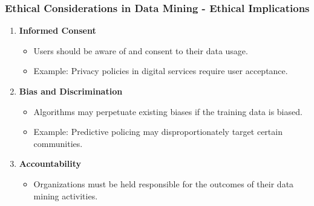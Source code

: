 \documentclass{beamer}
\begin{document}
\begin{frame}[fragile]
    \frametitle{Ethical Considerations in Data Mining - Ethical Implications}
    \begin{enumerate}
        \item \textbf{Informed Consent}
            \begin{itemize}
                \item Users should be aware of and consent to their data usage.
                \item Example: Privacy policies in digital services require user acceptance.
            \end{itemize}
        \item \textbf{Bias and Discrimination}
            \begin{itemize}
                \item Algorithms may perpetuate existing biases if the training data is biased.
                \item Example: Predictive policing may disproportionately target certain communities.
            \end{itemize}
        \item \textbf{Accountability}
            \begin{itemize}
                \item Organizations must be held responsible for the outcomes of their data mining activities.
            \end{itemize}
    \end{enumerate}
\end{frame}
\end{document}
